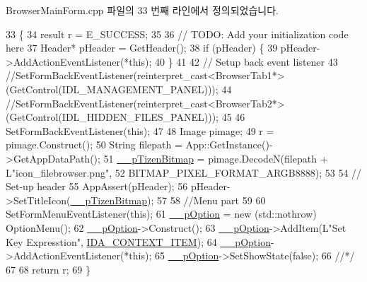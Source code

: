 Browser\+Main\+Form.\+cpp 파일의 33 번째 라인에서 정의되었습니다.


\begin{DoxyCode}
33                                            \{
34     result r = E\_SUCCESS;
35 
36     \textcolor{comment}{// TODO: Add your initialization code here}
37     Header* pHeader = GetHeader();
38     \textcolor{keywordflow}{if} (pHeader) \{
39         pHeader->AddActionEventListener(*\textcolor{keyword}{this});
40     \}
41 
42     \textcolor{comment}{// Setup back event listener}
43     \textcolor{comment}{//SetFormBackEventListener(reinterpret\_cast<BrowserTab1*>(GetControl(IDL\_MANAGEMENT\_PANEL)));}
44     \textcolor{comment}{//SetFormBackEventListener(reinterpret\_cast<BrowserTab2*>(GetControl(IDL\_HIDDEN\_FILES\_PANEL)));}
45 
46     SetFormBackEventListener(\textcolor{keyword}{this});
47 
48     Image pimage;
49     r = pimage.Construct();
50     String filepath = App::GetInstance()->GetAppDataPath();
51     \hyperlink{class_browser_main_form_a9ebb215a8612469b49cd95dee767e9cc}{\_\_pTizenBitmap} = pimage.DecodeN(filepath + L\textcolor{stringliteral}{"icon\_filebrowser.png"},
52             BITMAP\_PIXEL\_FORMAT\_ARGB8888);
53 
54     \textcolor{comment}{// Set-up header}
55     AppAssert(pHeader);
56     pHeader->SetTitleIcon(\hyperlink{class_browser_main_form_a9ebb215a8612469b49cd95dee767e9cc}{\_\_pTizenBitmap});
57 
58     \textcolor{comment}{//Menu part}
59     
60     SetFormMenuEventListener(\textcolor{keyword}{this});
61     \hyperlink{class_browser_main_form_a6767421f0f61a506e9b187449676fda2}{\_\_pOption} = \textcolor{keyword}{new} (std::nothrow) OptionMenu();
62     \hyperlink{class_browser_main_form_a6767421f0f61a506e9b187449676fda2}{\_\_pOption}->Construct();
63     \hyperlink{class_browser_main_form_a6767421f0f61a506e9b187449676fda2}{\_\_pOption}->AddItem(L\textcolor{stringliteral}{"Set Key Expresstion"}, \hyperlink{class_browser_main_form_a0a7d8a0178a9034082799ab0aeeb28f0}{IDA\_CONTEXT\_ITEM});
64     \hyperlink{class_browser_main_form_a6767421f0f61a506e9b187449676fda2}{\_\_pOption}->AddActionEventListener(*\textcolor{keyword}{this});
65     \hyperlink{class_browser_main_form_a6767421f0f61a506e9b187449676fda2}{\_\_pOption}->SetShowState(\textcolor{keyword}{false});
66     \textcolor{comment}{//*/}
67 
68     \textcolor{keywordflow}{return} r;
69 \}
\end{DoxyCode}
